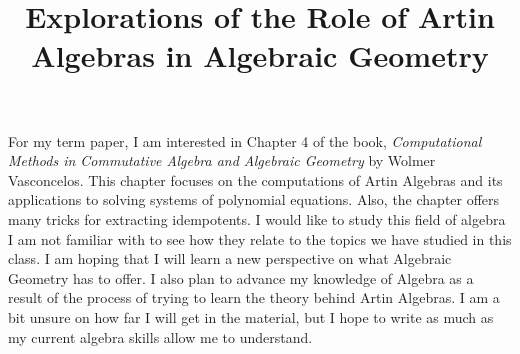\documentclass[11pt]{article}
\title{Explorations of the Role of Artin Algebras in Algebraic Geometry}
\author{\Name}
\begin{document}
\maketitle 
 
For my term paper, I am interested in Chapter 4 of the book, \emph{Computational Methods in Commutative Algebra and Algebraic Geometry} by 
Wolmer Vasconcelos. This chapter focuses on the computations of Artin Algebras and its applications to solving systems of polynomial equations.
Also, the chapter offers many tricks for extracting idempotents. I would like to study this field of algebra I am not familiar with to see how they relate to the 
topics we have studied in this class. I am hoping that I will learn a new perspective on what Algebraic Geometry has to offer. I also plan to advance my knowledge of Algebra as a result of the process of trying to learn the theory behind Artin Algebras. I am
a bit unsure on how far I will get in the material, but I hope to write as much as my current algebra skills allow me to understand. 
\end{document}
